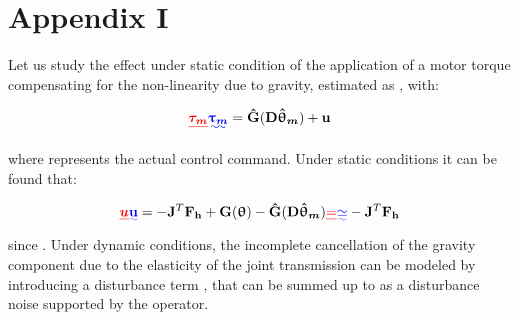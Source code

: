 \section{Appendix I}

Let us study the effect under static condition of the application of a motor torque compensating for the non-linearity due to gravity, estimated as 
\DIFdelbegin {}\DIFdelend \DIFaddbegin {}\DIFaddend , with:

\begin{equation}\DIFdelbegin \DIFdel{
\vects{\tau_m}}\DIFdelend \DIFaddbegin \DIFadd{
\vects{\uptau_m}}\DIFaddend =  \DIFdelbegin %
\DIFdelend \DIFaddbegin \vect{\hat{G}}\DIFaddend (\vectm{D} \DIFdelbegin %
\DIFdelend \DIFaddbegin \vects{\hat{\uptheta}_m}\DIFaddend )+\DIFdelbegin %
\DIFdelend \DIFaddbegin \vect{u}
\DIFaddend \label{eq:inputForce}
\end{equation}

where  \DIFdelbegin {}\DIFdelend \DIFaddbegin {}\DIFaddend represents the actual control command.
Under static conditions it can be found that:

\begin{equation}\DIFdelbegin \DIFdel{
\vects{u}}\DIFdelend \DIFaddbegin \DIFadd{
\vect{u}}\DIFaddend =-  \vectm{J}^T \DIFdelbegin %
\DIFdelend \DIFaddbegin \vect{F_h} \DIFaddend +\DIFdelbegin %
\DIFdelend \DIFaddbegin \vect{G}\DIFaddend ( \DIFdelbegin %
\DIFdelend \DIFaddbegin \vects{\uptheta}\DIFaddend ) - \DIFdelbegin %
\DIFdelend \DIFaddbegin \vect{\hat{G}}\DIFaddend (\vectm{D} \DIFdelbegin %
\DIFdelend \DIFaddbegin \vects{\hat{\uptheta}_m}\DIFaddend )  \DIFdelbegin \DIFdel{= }\DIFdelend \DIFaddbegin \DIFadd{\simeq }\DIFaddend - \vectm{J}^T \DIFdelbegin %
\DIFdelend \DIFaddbegin \vect{F_h}
\DIFaddend \label{eq:inputInStaticCondition}
\end{equation}
since \DIFdelbegin {}\DIFdelend \DIFaddbegin {}\DIFaddend . Under dynamic conditions, the incomplete cancellation of the gravity component due to the elasticity of the joint transmission can be modeled by introducing a disturbance term \DIFdelbegin {}\DIFdelend \DIFaddbegin {}\DIFaddend , that can be summed up 
to \DIFdelbegin {}\DIFdelend \DIFaddbegin {}\DIFaddend as a disturbance noise supported by the operator.


